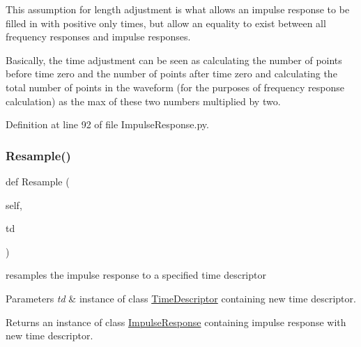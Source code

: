 This assumption for length adjustment is what allows an impulse response to be filled in with positive only times, but allow an equality to exist between all frequency responses and impulse responses.

Basically, the time adjustment can be seen as calculating the number of points before time zero and the number of points after time zero and calculating the total number of points in the waveform (for the purposes of frequency response calculation) as the max of these two numbers multiplied by two. 

Definition at line 92 of file Impulse\+Response.\+py.

\mbox{\label{classSignalIntegrity_1_1TimeDomain_1_1Waveform_1_1ImpulseResponse_1_1ImpulseResponse_adc3851330110033606ca742a0025ae1a}} 
\subsubsection{\texorpdfstring{Resample()}{Resample()}}
{\footnotesize\ttfamily def Resample (\begin{DoxyParamCaption}\item[{}]{self,  }\item[{}]{td }\end{DoxyParamCaption})}



resamples the impulse response to a specified time descriptor 


\begin{DoxyParams}{Parameters}
{\em td} & instance of class \hyperlink{namespaceSignalIntegrity_1_1TimeDomain_1_1Waveform_1_1TimeDescriptor}{Time\+Descriptor} containing new time descriptor. \\
\hline
\end{DoxyParams}
\begin{DoxyReturn}{Returns}
an instance of class \hyperlink{classSignalIntegrity_1_1TimeDomain_1_1Waveform_1_1ImpulseResponse_1_1ImpulseResponse}{Impulse\+Response} containing impulse response with new time descriptor. 
\end{DoxyReturn}


